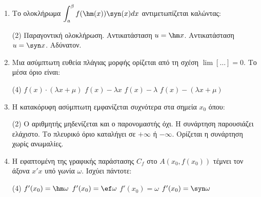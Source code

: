 \documentclass[11pt,a4paper]{article}
\renewcommand{\textdexiakeraia}{}
\newcommand{\dint}{\displaystyle\int}
\begin{document}
\begin{enumerate}[label=\textbf{\arabic*.}, itemsep=4mm]
    \item Το ολοκλήρωμα $\dint_{a}^{\beta} f(\hm(x)) \syn(x) dx$ αντιμετωπίζεται καλώντας:
    \begin{tasks}[label=\let\textdexiakeraia\relax\alph*.](2)
        \task Παραγοντική ολοκλήρωση.
        \task Αντικατάσταση $u = \hm x$.
        \task Αντικατάσταση $u = \syn x$.
        \task Αδύνατον.
    \end{tasks}

    \item Μια ασύμπτωτη ευθεία πλάγιας μορφής ορίζεται από τη σχέση $\lim\limits [\dots] = 0$. Το μέσα όριο είναι:
    \begin{tasks}[label=\let\textdexiakeraia\relax\alph*.](4)
        \task $f(x) \cdot (\lambda x + \mu)$
        \task $f(x) - \lambda x$
        \task $f(x) - \lambda$
        \task $f(x) - (\lambda x + \mu)$
    \end{tasks}

    \item Η κατακόρυφη ασύμπτωτη εμφανίζεται συχνότερα στα σημεία $x_0$ όπου:
    \begin{tasks}[label=\let\textdexiakeraia\relax\alph*.](2)
        \task Ο αριθμητής μηδενίζεται και ο παρονομαστής όχι.
        \task Η συνάρτηση παρουσιάζει ελάχιστο.
        \task Το πλευρικό όριο καταλήγει σε $+\infty$ ή $-\infty$.
        \task Ορίζεται η συνάρτηση χωρίς ανωμαλίες.
    \end{tasks}

    \item Η εφαπτομένη της γραφικής παράστασης $C_f$ στο $A(x_0, f(x_0))$ τέμνει τον άξονα $x'x$ υπό γωνία $\omega$. Ισχύει πάντοτε:
    \begin{tasks}[label=\let\textdexiakeraia\relax\alph*.](4)
        \task $f'(x_0) = \hm \omega$
        \task $f'(x_0) = \ef \omega$
        \task $f'(x_0) = \omega$
        \task $f'(x_0) = \syn \omega$
    \end{tasks}



\end{enumerate}
\end{document}
